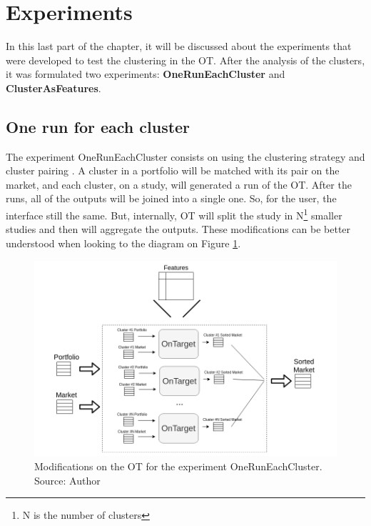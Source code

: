 \section{Experiments}

\newcommand{\nameExperimentI}{OneRunEachCluster}
\newcommand{\nameExperimentII}{ClusterAsFeatures}


In this last part of the chapter, it will be discussed about the experiments that were developed to test the clustering in the OT. After the analysis of the clusters, it was formulated two experiments: \textbf{\nameExperimentI{}} and \textbf{\nameExperimentII{}}.

\subsection{One run for each cluster}
\label{ch:experiment-i}

The experiment \nameExperimentI{} consists on using the clustering strategy \nameClusterStrategyA{} and cluster pairing \nameClusterPairingA{}. A cluster in a portfolio will be matched with its pair on the market, and each cluster, on a study, will generated a run of the OT. After the runs, all of the outputs will be joined into a single one. So, for the user, the interface still the same. But, internally, OT will split the study in N\footnote{N is the number of clusters} smaller studies and then will aggregate the outputs. These modifications can be better understood when looking to the diagram on Figure \ref{fig:one-run-each-cluster}. 

\begin{figure}[h]
   \centering
   \includegraphics[width=\linewidth]{fig/ch3-one-run-each-cluster.png}
   \caption{Modifications on the OT for the experiment \nameExperimentI{}. Source: Author}
   \label{fig:one-run-each-cluster}
\end{figure}

